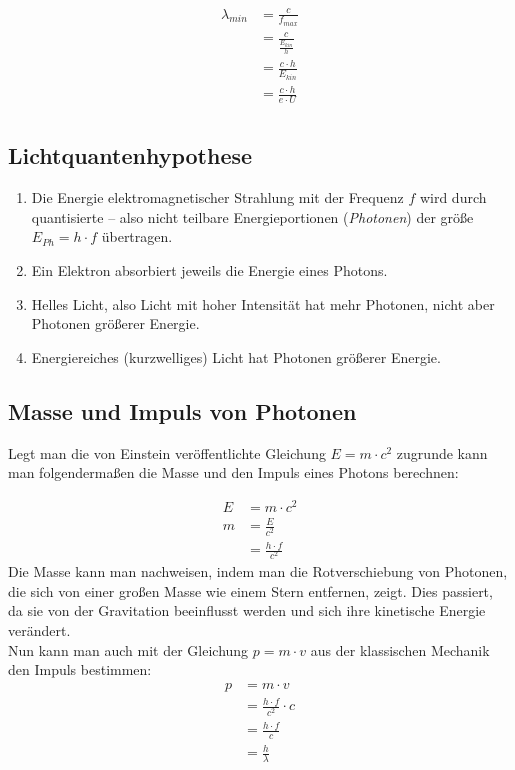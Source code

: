 \documentclass[a4paper]{article}
\begin{document}
			\begin{equation}
				\begin{aligned}
					\lambda_{min} &= \frac{c}{f_{max}}\\
					&= \frac{c}{\frac{E_{kin}}{h}}\\
					&= \frac{c\cdot h}{E_{kin}}\\
					&= \frac{c\cdot h}{e\cdot U}\\
				\end{aligned}
			\end{equation}
			
		\subsection{Lichtquantenhypothese}
		\begin{enumerate}
			\item Die Energie elektromagnetischer Strahlung mit der Frequenz $f$ wird durch quantisierte – also nicht teilbare Energieportionen (\textit{Photonen}) der größe $E_{Ph} = h\cdot f$ übertragen.
			\item Ein Elektron absorbiert jeweils die Energie eines Photons.
			\item Helles Licht, also Licht mit hoher Intensität hat mehr Photonen, nicht aber Photonen größerer Energie.
			\item Energiereiches (kurzwelliges) Licht hat Photonen größerer Energie.
		\end{enumerate}				
			
		\subsection{Masse und Impuls von Photonen}
			Legt man die von Einstein veröffentlichte Gleichung $E=m\cdot c^2$ zugrunde kann man folgendermaßen die Masse und den Impuls eines Photons berechnen:
			
			\begin{equation}
				\begin{aligned}
					E&=m\cdot c^2\\
					m &= \frac{E}{c^2}\\
					&= \frac{h\cdot f}{c^2}
				\end{aligned}
			\end{equation}
			Die Masse kann man nachweisen, indem man die Rotverschiebung von Photonen, die sich von einer großen Masse wie einem Stern entfernen, zeigt. Dies passiert, da sie von der Gravitation beeinflusst werden und sich ihre kinetische Energie verändert.\\
			Nun kann man auch mit der Gleichung $p=m\cdot v$ aus der klassischen Mechanik den Impuls bestimmen:
			\begin{equation}
				\begin{aligned}
					p&=m\cdot v\\
					&=\frac{h\cdot f}{c^2}\cdot c\\
					&=\frac{h\cdot f}{c}\\
					&=\frac{h}{\lambda}\\
				\end{aligned}
			\end{equation}
			
\end{document}
